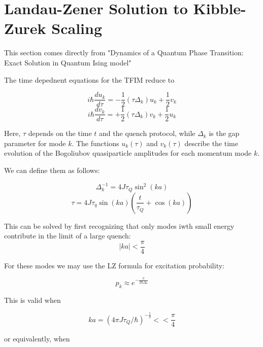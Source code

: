 \documentclass{article}
\begin{document}
\section{Landau-Zener Solution to Kibble-Zurek Scaling}
This section comes directly from "Dynamics of a Quantum Phase Transition: Exact Solution in Quantum Ising model"


The time depednent equations for the TFIM reduce to 

\begin{equation}
    i \hbar \frac{d u_k}{d\tau } = 
    -\frac{1}{2} ( \tau \Delta_k) u_k + \frac{1}{2}v_k
\end{equation}
\begin{equation}
    i \hbar \frac{d v_k}{d\tau } = 
    +\frac{1}{2} ( \tau \Delta_k) v_k + \frac{1}{2}u_k
\end{equation}

Here, $\tau$ depends on the time $t$ and the quench protocol, while $\Delta_k$ is the gap parameter for mode $k$. The functions $u_k(\tau)$ and $v_k(\tau)$ describe the time evolution of the Bogoliubov quasiparticle amplitudes for each momentum mode $k$.

We can define them as follows:

\begin{equation}
    \Delta_k ^{-1} = 4 J \tau_Q \sin^2(ka)
\end{equation}
\begin{equation}
    \tau = 4 J \tau_q \sin(ka)(\frac{t}{\tau_Q}+\cos(ka))
\end{equation}

This can be solved by first recognizing that only modes iwth small energy contribute in the limit of a large quench: 
\begin{equation}
    |ka| < \frac{\pi}{4}
\end{equation}

For these modes we may use the LZ formula for excitation probability:

\begin{equation}
    p_k \approx e^{-\frac{\pi}{2 \hbar \Delta_k}}
\end{equation}

This is valid when

\begin{equation}
    ka = (4 \pi J \tau_Q / \hbar )^{-\frac{1}{2}} << \frac{\pi}{4}
\end{equation}

or equivalently, when 
\end{document}
